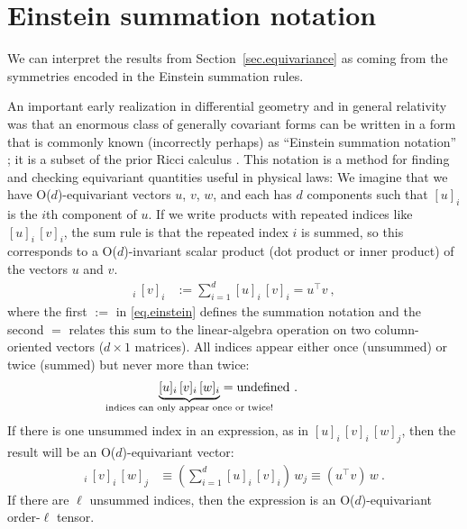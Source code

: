 \documentclass{article}
\theoremstyle{Hogg}
\begin{document}
\section{Einstein summation notation}\label{sec.einstein}
We can interpret the results from Section~\ref{sec.equivariance} as coming from the symmetries encoded in the Einstein summation rules.

An important early realization in differential geometry and in general relativity was that an enormous class of generally covariant forms can be written in a form that is commonly known (incorrectly perhaps) as ``Einstein summation notation'' \cite{einstein}; it is a subset of the prior Ricci calculus \cite{ricci}.
This notation is a method for finding and checking equivariant quantities useful in physical laws:
We imagine that we have O($d$)-equivariant vectors $u$, $v$, $w$, and each has $d$ components such that $[u]_i$ is the $i$th component of $u$.
If we write products with repeated indices like $[u]_i\,[v]_i$, the sum rule is that the repeated index $i$ is summed, so this corresponds to a O($d$)-invariant scalar product (dot product or inner product) of the vectors $u$ and $v$. 
\begin{align}
    [u]_i\,[v]_i &:= \sum_{i=1}^d [u]_i\,[v]_i = u^\top v \label{eq.einstein}
    ~,
\end{align}
where the first $:=$ in \eqref{eq.einstein} defines the summation notation and 
 the second $=$ relates this sum to the linear-algebra operation on two column-oriented vectors ($d\times 1$ matrices).
All indices appear either once (unsummed) or twice (summed) but never more than twice:
\begin{align}
\underbrace{[u]_i\,[v]_i\,[w]_i}_{\mathclap{\text{indices can only appear once or twice!}}} &= \text{undefined}
    ~.
    \end{align}
If there is one unsummed index in an expression, as in $[u]_i\,[v]_i\,[w]_j$, then the result will be an O($d$)-equivariant vector:
\begin{align}
    [u]_i\,[v]_i\,[w]_j &\equiv \left(\sum_{i=1}^d [u]_i\,[v]_i\right)\,w_j \equiv (u^\top v)\,w
    ~.
\end{align}
If there are $\ell$ unsummed indices, then the expression is an O($d$)-equivariant order-$\ell$ tensor.
\end{document}
